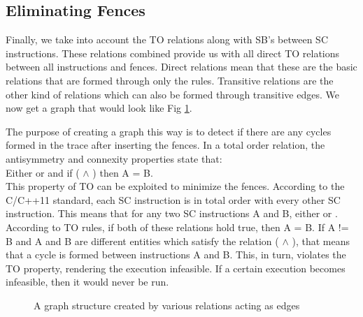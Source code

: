 \subsection{Eliminating Fences}
Finally, we take into account the TO relations along with SB's between SC instructions. These relations combined provide us with all direct TO relations between all instructions and fences. Direct relations mean that these are the basic relations that are formed through only the rules. Transitive relations are the other kind of relations which can also be formed through transitive edges. We now get a graph that would look like Fig \ref{fig:cycles}.

\par
The purpose of creating a graph this way is to detect if there are any cycles formed in the trace after inserting the fences. In a total order relation, the antisymmetry and connexity properties state that:\\
Either  or  and if ( $\land$ ) then A = B.\\
This property of TO can be exploited to minimize the fences. According to the C/C++11 standard, each SC instruction is in total order with every other SC instruction. This means that for any two SC instructions A and B, either  or . According to TO rules, if both of these relations hold true, then A = B. If A != B and A and B are different entities which satisfy the relation ( $\land$ ), that means that a cycle is formed between instructions A and B. This, in turn, violates the TO property, rendering the execution infeasible. If a certain execution becomes infeasible, then it would never be run.

\begin{figure}
\begin{center}
	
	\caption{A graph structure created by various relations acting as edges}
	\label{fig:cycles}
\end{center}
\end{figure}

